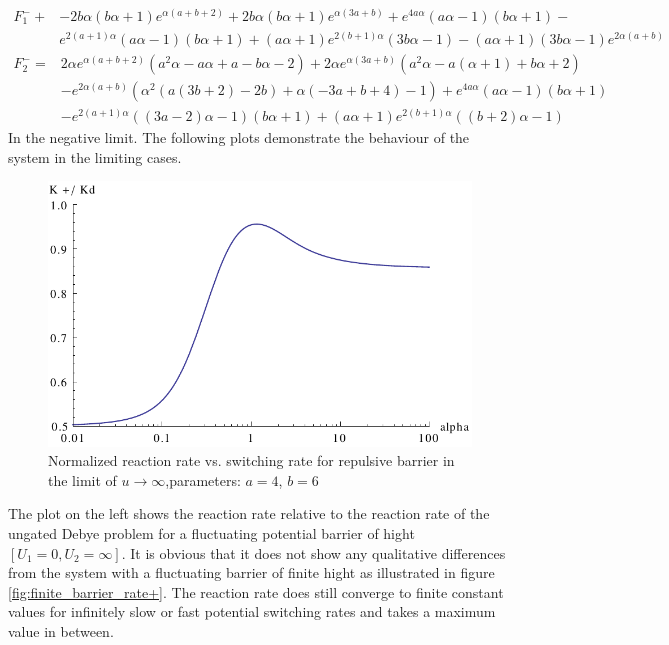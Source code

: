 \begin{align*}
    F_{1}^{-} + &-2 b \alpha (b \alpha+1) e^{\alpha (a+b+2)}+2 b \alpha (b \alpha+1) e^{\alpha (3 a+b)}+e^{4 a \alpha} (a \alpha-1) (b \alpha+1)- \\
                &e^{2 (a+1) \alpha} (a \alpha-1) (b \alpha+1)+(a \alpha+1) e^{2 (b+1) \alpha} (3 b \alpha-1)-(a \alpha+1) (3 b \alpha-1) e^{2 \alpha (a+b)}
\end{align*}
\begin{align*}
    F_{2}^{-} = & 2 \alpha e^{\alpha (a+b+2)} \left(a^2 \alpha-a \alpha+a-b \alpha-2\right)+2 \alpha e^{\alpha (3 a+b)} \left(a^2 \alpha-a (\alpha+1)+b \alpha+2\right) \\
                &-e^{2 \alpha (a+b)} \left(\alpha^2 (a (3 b+2)-2 b)+\alpha (-3 a+b+4)-1\right)+e^{4 a \alpha} (a \alpha-1) (b \alpha+1) \\
                &-e^{2 (a+1) \alpha} ((3 a-2) \alpha-1) (b \alpha+1)+(a \alpha+1) e^{2 (b+1) \alpha} ((b+2) \alpha-1)
\end{align*}
In the negative limit. The following plots demonstrate the behaviour of the system in the limiting cases.
\newpage
\begin{minipage}[t]{0.7 \textwidth}
    \begin{figure}[H]
        \includegraphics[width = 1 \textwidth]{plots/K+.pdf}
    \caption{Normalized reaction rate vs. switching rate for \newline repulsive barrier in the limit of $u \rightarrow \infty$,\newline parameters: $a = 4$, $b = 6$}
    \end{figure}
\end{minipage}\begin{minipage}[t]{0.3 \textwidth}
    The plot on the left shows the reaction rate relative to the reaction rate of the ungated Debye problem for a fluctuating potential barrier of hight $[U_1 = 0, U_2 = \infty]$. It is obvious that it does not show any qualitative differences from the system with a fluctuating barrier of finite hight as illustrated in figure \ref{fig:finite_barrier_rate+}. The reaction rate does still converge to finite constant values for infinitely slow or fast potential switching rates and takes a maximum value in between.
\end{minipage}

